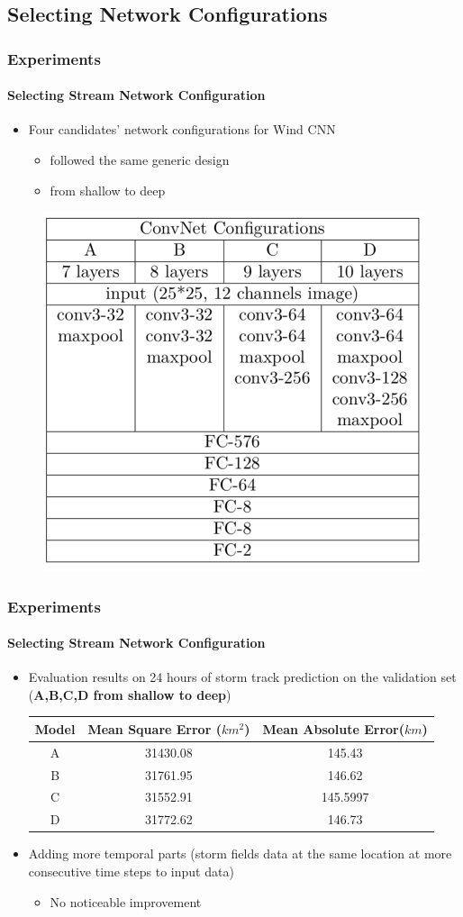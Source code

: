 \documentclass{beamer}
\begin{document}
\subsection{Selecting Network Configurations}
\begin{frame}
\frametitle{Experiments}
\framesubtitle{Selecting Stream Network Configuration}
\begin{itemize}
	\item  Four candidates' network configurations for Wind CNN\\
	\begin{itemize}
		\item followed the same generic design
		\item from shallow to deep
	\end{itemize}
\end{itemize}
\begin{figure}
	\includegraphics[width=0.4\linewidth, height=0.5\textheight]{figs/candidates.png} \\
\end{figure}
\end{frame}

\begin{frame}
\frametitle{Experiments}
\framesubtitle{Selecting Stream Network Configuration}
\begin{itemize}
	\item  Evaluation results on 24 hours of storm track prediction on the validation set (\textbf{A,B,C,D from shallow to deep})\\

\begin{table}[]
	\centering
	\begin{tabular}{|c|c|c|}
		\hline
		Model& Mean Square Error ($km^2$) & Mean Absolute Error($km$) \\ \hline
		A & 31430.08 & 145.43  \\ \hline
		B & 31761.95 & 146.62  \\ \hline
		C & 31552.91 & 145.5997 \\ \hline
		D & 31772.62 & 146.73 \\ \hline
	\end{tabular}
\end{table}
	\item Adding more temporal parts (storm fields data at the same location at more consecutive time steps to input data)
	\begin{itemize}
		\item  No noticeable improvement\\
	\end{itemize}
\end{itemize}
\end{frame}
\end{document}
